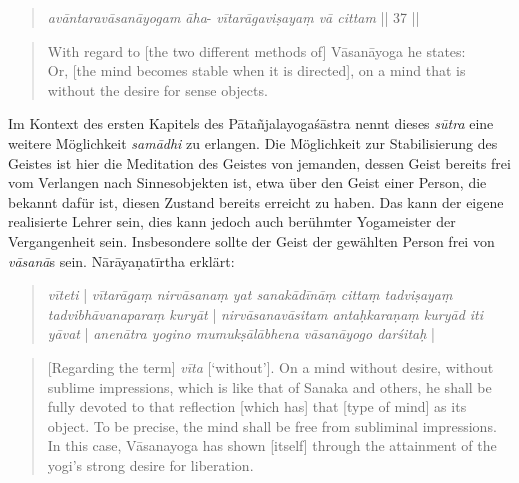 \begin{quote}
\textit{avāntaravāsanāyogam āha}-
\textit{vītarāgaviṣayaṃ vā cittam} || 37 ||
\end{quote}
\begin{quote}
With regard to [the two different methods of] Vāsanāyoga he states: \\
Or, [the mind becomes stable when it is directed], on a mind that is without the desire for sense objects. 
\end{quote}

Im Kontext des ersten Kapitels des Pātañjalayogaśāstra nennt dieses \textit{sūtra} eine weitere Möglichkeit \textit{samādhi} zu erlangen. Die Möglichkeit zur Stabilisierung des Geistes ist hier die Meditation des Geistes von jemanden, dessen Geist bereits frei vom Verlangen nach Sinnesobjekten ist, etwa über den Geist einer Person, die bekannt dafür ist, diesen Zustand bereits erreicht zu haben. Das kann der eigene realisierte Lehrer sein, dies kann jedoch auch berühmter Yogameister der Vergangenheit sein. Insbesondere sollte der Geist der gewählten Person frei von \textit{vāsanā}s sein. Nārāyaṇatīrtha erklärt:

\begin{quote}
  \textit{vīteti} | \textit{vītarāgaṃ nirvāsanaṃ yat sanakādīnāṃ cittaṃ tadviṣayaṃ tadvibhāvanaparaṃ kuryāt} | \textit{nirvāsanavāsitam antaḥkaraṇaṃ kuryād iti yāvat} | \textit{anenātra yogino mumukṣālābhena vāsanāyogo darśitaḥ} |
\end{quote}
\begin{quote}
[Regarding the term] \textit{vīta} [`without']. On a mind without desire, without sublime impressions, which is like that of Sanaka and others, he shall be fully devoted to that reflection [which has] that [type of mind] as its object. To be precise, the mind shall be free from subliminal impressions. In this case, Vāsanayoga has shown [itself] through the attainment of the yogi's strong desire for liberation. 
\end{quote}

